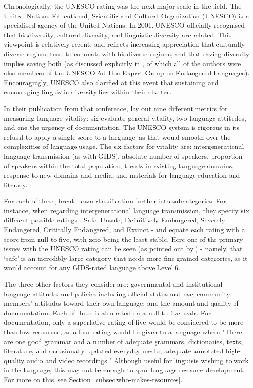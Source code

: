 Chronologically, the UNESCO rating was the next major scale in the field. The United Nations Educational, Scientific and Cultural Organization (UNESCO) is a specialised agency of the United Nations. In 2001, UNESCO officially recognised that biodiversity, cultural diversity, and linguistic diversity are related. This viewpoint is relatively recent, and reflects increasing appreciation that culturally diverse regions tend to collocate with biodiverse regions, and that saving diversity implies saving both \citep{nettle2000vanishing, maffi2001biocultural, maffi2004world, anderson2006language, krauss2007keynote, gorenflo2012co} (as discussed explicitly in \citet{maffi2001}, of which all of the authors were also members of the UNESCO Ad Hoc Expert Group on Endangered Languages). Encouragingly, UNESCO also clarified at this event that sustaining and encouraging linguistic diversity lies within their charter.

In their publication from that conference, \citet{brenzinger2003language} lay out nine different metrics for measuring language vitality: six evaluate general vitality, two language attitudes, and one the urgency of documentation. The UNESCO system is rigorous in its refusal to apply a single score to a language, as that would smooth over the complexities of language usage. The six factors for vitality are: intergenerational language transmission (as with GIDS), absolute number of speakers, proportion of speakers within the total population, trends in existing language domains, response to new domains and media, and materials for language education and literacy.

For each of these, \citet{brenzinger2003language} break down classification further into subcategories. For instance, when regarding intergenerational language transmission, they specify six different possible ratings - Safe, Unsafe, Definitively Endangered, Severely Endangered, Critically Endangered, and Extinct - and equate each rating with a score from null to five, with zero being the least stable. Here one of the primary issues with the UNESCO rating can be seen  (as pointed out by \citet{lewis2010assessing}) - namely, that `safe' is an incredibly large category that needs more fine-grained categories, as it would account for any GIDS-rated language above Level 6.

The three other factors they consider are: governmental and institutional language attitudes and policies including official status and use; community members' attitudes toward their own language; and the amount and quality of documentation. Each of these is also rated on a null to five scale. For documentation, only a superlative rating of five would be considered to be more than low resourced, as a four rating would be given to a language where "There are one good grammar and a number of adequate grammars, dictionaries, texts, literature, and occasionally updated everyday media; adequate annotated high-quality audio and video recordings." Although useful for linguists wishing to work in the language, this may not be enough to spur language resource development. For more on this, see Section~\ref{subsec:who-makes-resources}.

